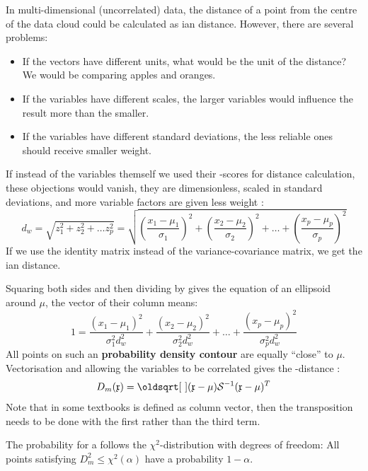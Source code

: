 \begin{refsection}
In multi-dimensional (uncorrelated) data, the distance of a point from the centre of the data cloud could be calculated as ian distance. However, there are several problems:
\begin{itemize}
  \item{If the vectors have different units, what would be the unit of the distance? We would be comparing apples and oranges.}
  \item{If the variables have different scales, the larger variables would influence the result more than the smaller.}
  \item{If the variables have different standard deviations, the less reliable ones should receive smaller weight.}
\end{itemize}
If instead of the variables themself we used their -scores for distance calculation, these objections would vanish, they are dimensionless, scaled in standard deviations, and more variable factors are given less weight \parencite{War-11}:
\begin{equation}\label{eqn:Maha}
  d_w = \sqrt{z_1^2 + z_2^2 + \ldots z_p^2} = \sqrt{\left(\frac{x_1 - \mu_1}{\sigma_1}\right)^2 + \left(\frac{x_2 - \mu_2}{\sigma_2}\right)^2 + \ldots + \left(\frac{x_p - \mu_p}{\sigma_p}\right)^2}
\end{equation}
If we use the identity matrix instead of the variance-covariance matrix, we get the ian distance.

Squaring both sides and then dividing by  gives the equation of an ellipsoid around \(\mu \), the vector of their column means:
\begin{equation}
  1 = \frac{(x_1 - \mu_1)^2}{\sigma_1^2 d_w^2} + \frac{(x_2 - \mu_2)^2}{\sigma_2^2 d_w^2} + \ldots + \frac{(x_p - \mu_p)^2}{\sigma_p^2 d_w^2}
\end{equation}
All points on such an \textbf{probability density contour} are equally ``close'' to \(\mu \). Vectorisation and allowing the variables to be correlated gives the -distance  \parencite{Mah-36}:
\begin{equation}
  D_m(\AbsVec{x}) = \sqrt{(\AbsVec{x} - \mu) \arr{S}^{-1} (\AbsVec{x} - \mu)^T}
\end{equation}
Note that in some textbooks  is defined as column vector, then the transposition needs to be done with the first rather than the third term.

The probability for a  follows the \(\chi^2 \)-distribution with  degrees of freedom: All points satisfying \(D_m^2 \leq \chi^2(\alpha) \) have a probability \(1 - \alpha \).


\end{refsection}
